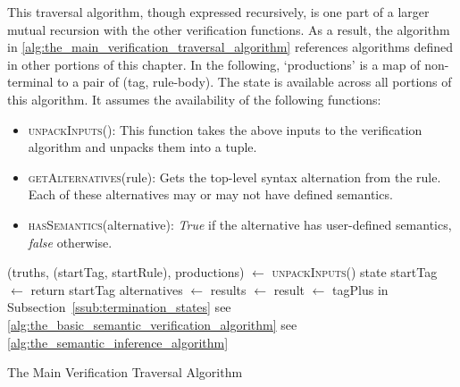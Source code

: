 This traversal algorithm, though expressed recursively, is one part of a larger mutual recursion with the other verification functions. 
As a result, the algorithm in \autoref{alg:the_main_verification_traversal_algorithm} references algorithms defined in other portions of this chapter.
In the following, `productions' is a map of non-terminal to a pair of (tag, rule-body). 
The state is available across all portions of this algorithm.
It assumes the availability of the following functions:
\begin{itemize}
    \item \textsc{unpackInputs}(): This function takes the above inputs to the verification algorithm and unpacks them into a tuple.
    \item \textsc{getAlternatives}(rule): Gets the top-level syntax alternation from the rule. 
    Each of these alternatives may or may not have defined semantics.
    \item \textsc{hasSemantics}(alternative): \textit{True} if the alternative has user-defined semantics, \textit{false} otherwise.
\end{itemize}

\begin{algorithm}
\begin{algorithmic}
\State
\State (truths, (startTag, startRule), productions) $\gets$ \textsc{unpackInputs}()
\Comment state
\State
\State startTag $\gets$ 
\State return startTag
\State
{}
    \State alternatives $\gets$ 
    \State results $\gets$ 
    \State result $\gets$ 
    \Comment tagPlus in Subsection~\ref{ssub:termination_states}
    \State {}
\EndFunction
\State
{}
        \State {}
        \Comment see \autoref{alg:the_basic_semantic_verification_algorithm}
    \Else
        \State {}
        \Comment see \autoref{alg:the_semantic_inference_algorithm}
    \EndIf
\EndFunction
\end{algorithmic}
\caption{The Main Verification Traversal Algorithm}
\label{alg:the_main_verification_traversal_algorithm}
\end{algorithm}

